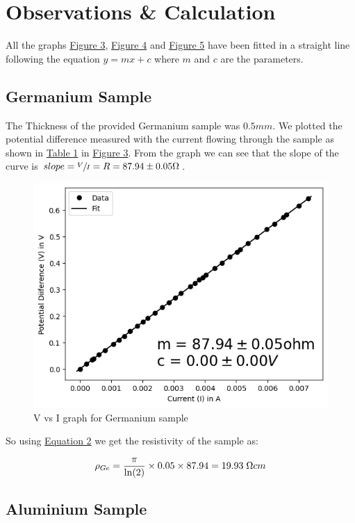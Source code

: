 \section{Observations \& Calculation}

	All the graphs \hyperref[graph:1]{Figure 3}, \hyperref[graph:2]{Figure 4} and \hyperref[graph:3]{Figure 5} have been fitted in a straight line following the equation $y = mx+c$ where $m$ and $c$ are the parameters.
	\subsection{Germanium Sample}

		The Thickness of the provided Germanium sample was $0.5mm$. We plotted the potential difference measured with the current flowing through the sample as shown in \hyperref[tab:1]{Table 1} in \hyperref[graph:1]{Figure 3}. From the graph we can see that the slope of the curve is $slope = \sfrac{V}{I} = R = 87.94\pm0.05\ohm$.

		
		
		\begin{figure}[h]
			\centering
			\includegraphics[width=0.8\columnwidth]{images/g1.png}
			\caption{V vs I graph for Germanium sample}
			\label{graph:1}
		\end{figure}

		So using \hyperref[eq:2]{Equation 2} we get the resistivity of the sample as:

		$$\rho_{Ge} = \frac{\pi}{\ln(2)}\times0.05\times87.94 = 19.93\;\ohm cm$$

	\subsection{Aluminium Sample}

